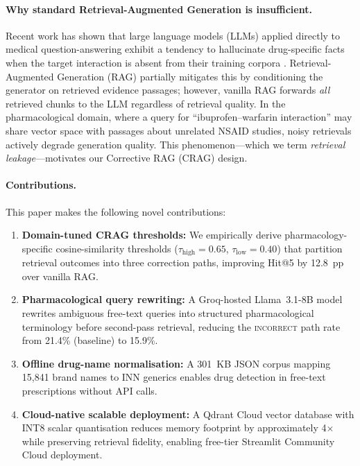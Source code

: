 \documentclass[10pt, twocolumn]{article}
\begin{document}
\paragraph{Why standard Retrieval-Augmented Generation is insufficient.}
Recent work has shown that large language models (LLMs) applied directly
to medical question-answering exhibit a tendency to hallucinate
drug-specific facts when the target interaction is absent from their
training corpora \cite{singhal2023large}.  Retrieval-Augmented Generation
(RAG) \cite{lewis2020rag} partially mitigates this by conditioning the
generator on retrieved evidence passages; however, vanilla RAG forwards
\emph{all} retrieved chunks to the LLM regardless of retrieval quality.
In the pharmacological domain, where a query for ``ibuprofen--warfarin
interaction'' may share vector space with passages about unrelated NSAID
studies, noisy retrievals actively degrade generation quality.  This
phenomenon—which we term \emph{retrieval leakage}—motivates our
Corrective RAG (CRAG) design.

\paragraph{Contributions.}
This paper makes the following novel contributions:
\begin{enumerate}[leftmargin=*,topsep=2pt,itemsep=1pt]
  \item \textbf{Domain-tuned CRAG thresholds:} We empirically derive
        pharmacology-specific cosine-similarity thresholds
        ($\tau_{\text{high}} = 0.65$, $\tau_{\text{low}} = 0.40$) that
        partition retrieval outcomes into three correction paths,
        improving Hit@5 by 12.8~pp over vanilla RAG.
  \item \textbf{Pharmacological query rewriting:} A Groq-hosted
        Llama~3.1-8B model rewrites ambiguous free-text queries into
        structured pharmacological terminology before second-pass
        retrieval, reducing the \textsc{incorrect} path rate from
        21.4\% (baseline) to 15.9\%.
  \item \textbf{Offline drug-name normalisation:} A 301~KB JSON corpus
        mapping 15,841 brand names to INN generics enables drug
        detection in free-text prescriptions without API calls.
  \item \textbf{Cloud-native scalable deployment:} A Qdrant Cloud
        vector database with INT8 scalar quantisation reduces memory
        footprint by approximately 4$\times$ while preserving retrieval
        fidelity, enabling free-tier Streamlit Community Cloud
        deployment.
\end{enumerate}
\end{document}
